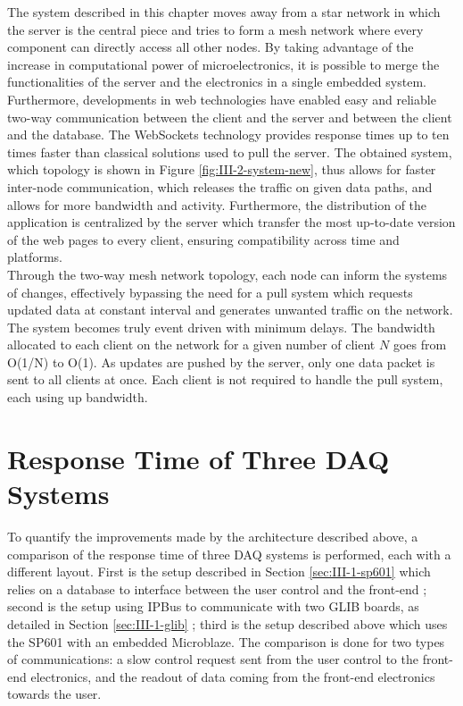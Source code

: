     The system described in this chapter moves away from a star network in which the server is the central piece and tries to form a mesh network where every component can directly access all other nodes. By taking advantage of the increase in computational power of microelectronics, it is possible to merge the functionalities of the server and the electronics in a single embedded system. Furthermore, developments in web technologies have enabled easy and reliable two-way communication between the client and the server and between the client and the database. The WebSockets technology provides response times up to ten times faster than classical solutions used to pull the server. The obtained system, which topology is shown in Figure \ref{fig:III-2-system-new}, thus allows for faster inter-node communication, which releases the traffic on given data paths, and allows for more bandwidth and activity. Furthermore, the distribution of the application is centralized by the server which transfer the most up-to-date version of the web pages to every client, ensuring compatibility across time and platforms. \\

    Through the two-way mesh network topology, each node can inform the systems of changes, effectively bypassing the need for a pull system which requests updated data at constant interval and generates unwanted traffic on the network. The system becomes truly event driven with minimum delays. The bandwidth allocated to each client on the network for a given number of client $ N $ goes from O(1/N) to O(1). As updates are pushed by the server, only one data packet is sent to all clients at once. Each client is not required to handle the pull system, each using up bandwidth.

  \section{Response Time of Three DAQ Systems}

    To quantify the improvements made by the architecture described above, a comparison of the response time of three DAQ systems is performed, each with a different layout. First is the setup described in Section \ref{sec:III-1-sp601} which relies on a database to interface between the user control and the front-end ; second is the setup using IPBus to communicate with two GLIB boards, as detailed in Section \ref{sec:III-1-glib} ; third is the setup described above which uses the SP601 with an embedded Microblaze. The comparison is done for two types of communications: a slow control request sent from the user control to the front-end electronics, and the readout of data coming from the front-end electronics towards the user.

